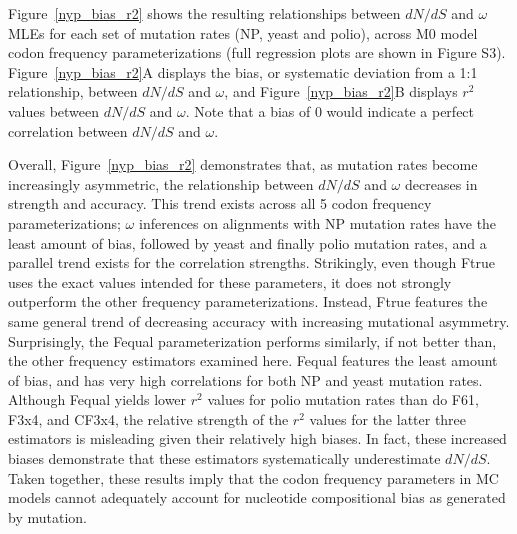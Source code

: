 \documentclass{pnastwo}
\begin{document}
\begin{article}
		
Figure~\ref{nyp_bias_r2} shows the resulting relationships between $dN/dS$ and $\omega$ MLEs for each set of mutation rates (NP, yeast and polio), across M0 model codon frequency parameterizations (full regression plots are shown in Figure S3). Figure~\ref{nyp_bias_r2}A displays the bias, or systematic deviation from a 1:1 relationship, between $dN/dS$ and $\omega$, and Figure~\ref{nyp_bias_r2}B displays $r^2$ values between $dN/dS$ and $\omega$. Note that a bias of 0 would indicate a perfect correlation between $dN/dS$ and $\omega$. 
		
Overall, Figure~\ref{nyp_bias_r2} demonstrates that, as mutation rates become increasingly asymmetric, the relationship between $dN/dS$ and $\omega$ decreases in strength and accuracy. This trend exists across all 5 codon frequency parameterizations; $\omega$ inferences on alignments with NP mutation rates have the least amount of bias, followed by yeast and finally polio mutation rates, and a parallel trend exists for the correlation strengths. Strikingly, even though Ftrue uses the exact values intended for these parameters, it does not strongly outperform the other frequency parameterizations. Instead, Ftrue features the same general trend of decreasing accuracy with increasing mutational asymmetry. Surprisingly, the Fequal parameterization performs similarly, if not better than, the other frequency estimators examined here. Fequal features the least amount of bias, and has very high correlations for both NP and yeast mutation rates. Although Fequal yields lower $r^2$ values for polio mutation rates than do F61, F3x4, and CF3x4, the relative strength of the $r^2$ values for the latter three estimators is misleading given their relatively high biases. In fact, these increased biases demonstrate that these estimators systematically underestimate $dN/dS$. Taken together, these results imply that the codon frequency parameters in MC models cannot adequately account for nucleotide compositional bias as generated by mutation. 
		

\end{article}
\end{document}
